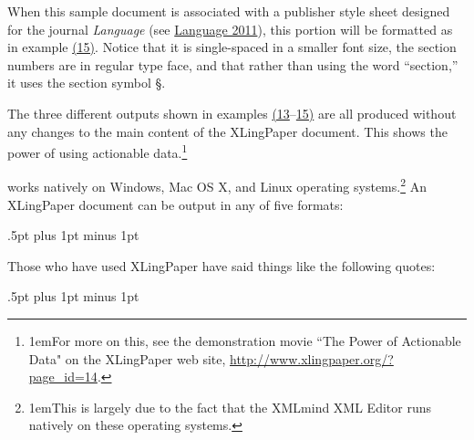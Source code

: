 \documentclass[12pt]{article}
\begin{document}
{\vspace{12pt}}\par\indent When this sample document is associated with a publisher style sheet designed for the journal {\textit{Language}} (see \hyperlink{rLanguageStyleSheet}{Language  2011}), this portion will be formatted as in example \hyperlink{xSVCZSectionsLanguage}{(15)}. Notice that it is single-spaced in a smaller font size, the section numbers are in regular type face, and that rather than using the word “section,” it uses the section symbol §.\par{}{\vspace{12pt}\raggedright{}
\vspace{12pt}}\par\indent The three different outputs shown in examples \hyperlink{xSVCZSectionsDefault}{(13}–\hyperlink{xSVCZSectionsLanguage}{15)} are all produced without any changes to the main content of the {XLingPaper} document.  This shows the power of using actionable data.\protect\footnote[6]{{\parindent1em\protect\hypertarget{nXLingPaperPowerOfActionableData}{}For more on this, see the demonstration movie “The Power of Actionable Data" on the {XLingPaper} web site, \href{http://www.xlingpaper.org/?page\_id=14}{http://www.xlingpaper.org/?page\_id=14}.}}\par{} works natively on Windows, Mac OS X, and Linux operating systems.\protect\footnote[7]{{\parindent1em\protect\hypertarget{nXXEOSes}{}This is largely due to the fact that the {XMLmind XML Editor} runs natively on these operating systems.}}  An {XLingPaper} document can be output in any of five formats:\par{}{\parskip .5pt plus 1pt minus 1pt

\vspace{\baselineskip}

{
}
{
}
{
}
{
}
{
}
\vspace{\baselineskip}
}\indent Those who have used {XLingPaper} have said things like the following quotes:\par{}{\parskip .5pt plus 1pt minus 1pt

}
\end{document}
